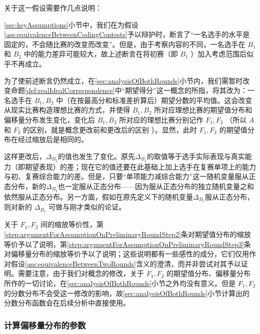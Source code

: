             关于这一假设需要作几点说明：
            \begin{asparaenum}
                \item \ref{sec:keyAssumptions}小节中，我们在为假设\ref{ass:equivalenceBetweenCodingContests}予以辩护时，断言了“一名选手的水平是固定的，不会随比赛的改变而改变”。但是，由于考察内容的不同，一名选手在 $B_1$ 和 $B_2$ 中的能力差异可能较大，故上述断言在将初赛（即 $B_1$ ）加入考虑范围后似乎不再成立。
                \item \label{step:argumentForAssumptionOnPreliminaryRoundStep2} 为了使前述断言仍然成立，在\ref{sec:analysisOfBothRounds}小节内，我们需暂时改变命题\ref{def:realIdealCorrespondence}中“期望得分”这一概念的所指，将其改为：一名选手在 $B_1,B_2$ 中（在按最高分和标准差折算后）期望分数的平均值。这会改变从现实比赛构造理想比赛的方式，并使得 $B_1,B_2$ 所对应理想比赛的期望值分布和偏移量分布发生变化，变化后 $B_1,B_2$ 所对应的理想比赛分别记作 $F_1,F_2$ （所以 $A$ 和 $F_2$ 的区别，就是概念更改前和更改后的区别 ）。显然，此时 $F_1,F_2$ 的期望值分布在经过缩放后是相同的。
                \item \label{step:argumentForAssumptionOnPreliminaryRoundStep3} 这样更改后，$\Delta_{B_2}$的值也发生了变化。原先$\Delta_{B_2}$的取值等于选手实际表现与真实能力（即期望表现）的差；现在它的值还要在此基础上加上选手在复赛单项上的能力与初、复赛综合能力的差。但是，只要“单项能力减综合能力”这一随机变量服从正态分布，新的$\Delta_{B_2}$也一定服从正态分布——因为服从正态分布的独立随机变量之和依然服从正态分布。另一方面，假如在原先定义下的随机变量$\Delta_{B_1}$服从正态分布，则对新的 $\Delta_{B_1}$ 可做与刚才类似的论证。
                \item 关于 $F_1,F_2$ 间的缩放等价性，第\ref{step:argumentForAssumptionOnPreliminaryRoundStep2}条对期望值分布的缩放等价予以了说明，第\ref{step:argumentForAssumptionOnPreliminaryRoundStep3}条对偏移量分布的缩放等价予以了说明；这些说明都有一些感性的成分，它们仅用作对假设\ref{ass:equivalenceBetweenTwoRounds}含义的澄清，而并非尝试对其予以证明。需要注意，由于我们对概念的修改，关于 $F_1,F_2$ 的期望值分布、偏移量分布所作的一切讨论，在\ref{sec:analysisOfBothRounds}小节之外均没有意义。但是 $F_1,F_2$ 的分数分布不会受这一修改的影响，故\ref{sec:analysisOfBothRounds}小节计算出的分数分布函数会在后续分析中直接使用。
            \end{asparaenum}

        \subsubsection{计算偏移量分布的参数}\label{sec:parameterOfDeltaDistribution}

